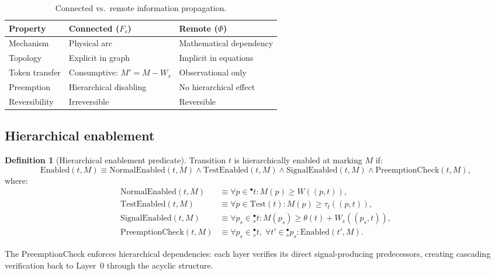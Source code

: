 \documentclass[11pt,a4paper]{article}
\theoremstyle{plain}
\theoremstyle{definition}
\newtheorem{definition}{Definition}
\begin{document}
\begin{table}[htbp]
\centering
\small
\caption{Connected vs.\ remote information propagation.}
\label{tab:connected-remote}
\begin{tabular}{p{2.2cm}p{3.9cm}p{3.9cm}}
\toprule
\textbf{Property} & \textbf{Connected ($F_s$)} & \textbf{Remote ($\Phi$)} \\
\midrule
Mechanism & Physical arc & Mathematical dependency \\
Topology & Explicit in graph & Implicit in equations \\
Token transfer & Consumptive: $M' = M - W_s$ & Observational only \\
Preemption & Hierarchical disabling & No hierarchical effect \\
Reversibility & Irreversible & Reversible \\
\bottomrule
\end{tabular}
\end{table}

\subsection{Hierarchical enablement}

\begin{definition}[Hierarchical enablement predicate]
Transition $t$ is hierarchically enabled at marking $M$ if:
\begin{equation}
\mathrm{Enabled}(t, M) \equiv \mathrm{NormalEnabled}(t,M) \wedge \mathrm{TestEnabled}(t,M) \wedge \mathrm{SignalEnabled}(t,M) \wedge \mathrm{PreemptionCheck}(t,M),
\end{equation}
where:
\begin{align}
\mathrm{NormalEnabled}(t,M) &\equiv \forall p \in {}^\bullet t: M(p) \geq W((p,t)), \\
\mathrm{TestEnabled}(t,M) &\equiv \forall p \in \mathrm{Test}(t): M(p) \geq \tau_t((p,t)), \\
\mathrm{SignalEnabled}(t,M) &\equiv \forall p_s \in {}^\bullet_s t: M(p_s) \geq \theta(t) + W_s((p_s,t)), \\
\mathrm{PreemptionCheck}(t,M) &\equiv \forall p_s \in {}^\bullet_s t,\; \forall t' \in {}^{\bullet}_s p_s: \mathrm{Enabled}(t',M).
\end{align}
\end{definition}

The PreemptionCheck enforces hierarchical dependencies: each layer verifies its direct signal-producing predecessors, creating cascading verification back to Layer~0 through the acyclic structure.
\end{document}
